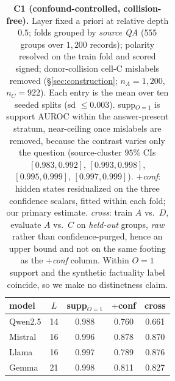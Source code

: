 \begin{table}[t]\centering\small
\setlength{\tabcolsep}{3.5pt}
\begin{tabular}{@{}lcccc@{}}
\toprule
model & $L$ & supp$_{O=1}$ & {\footnotesize$+$conf} & {\footnotesize cross} \\
\midrule
Qwen2.5 & 14 & 0.988 & 0.760 & 0.661 \\
Mistral & 16 & 0.996 & 0.878 & 0.870 \\
Llama   & 16 & 0.997 & 0.789 & 0.876 \\
Gemma   & 21 & 0.998 & 0.811 & 0.827 \\
\bottomrule
\end{tabular}
\caption{\textbf{C1 (confound-controlled, collision-free).} Layer fixed a priori at
relative depth $0.5$; folds grouped by \emph{source QA} ($555$ groups over $1{,}200$
records); polarity resolved on the train fold and scored signed; donor-collision cell-C
mislabels removed (\S\ref{sec:construction}; $n_A{=}1{,}200$, $n_C{=}922$). Each entry is
the mean over ten seeded splits (sd $\le0.003$). supp$_{O=1}$ is support AUROC within
the answer-present stratum, near-ceiling once mislabels are removed, because the
contrast varies only the question (source-cluster $95\%$ CIs $[0.983,0.992]$,
$[0.993,0.998]$, $[0.995,0.999]$, $[0.997,0.999]$). \emph{$+$conf}: hidden states
residualized on the three confidence scalars, fitted within each fold; our primary
estimate. \emph{cross}: train $A$ vs.\ $D$, evaluate $A$ vs.\ $C$ on \emph{held-out}
groups, \emph{raw} rather than confidence-purged, hence an upper bound and not on the
same footing as the \emph{$+$conf} column. Within $O{=}1$ support and the synthetic factuality label coincide, so we
make no distinctness claim.}
\label{tab:c1}
\end{table}

